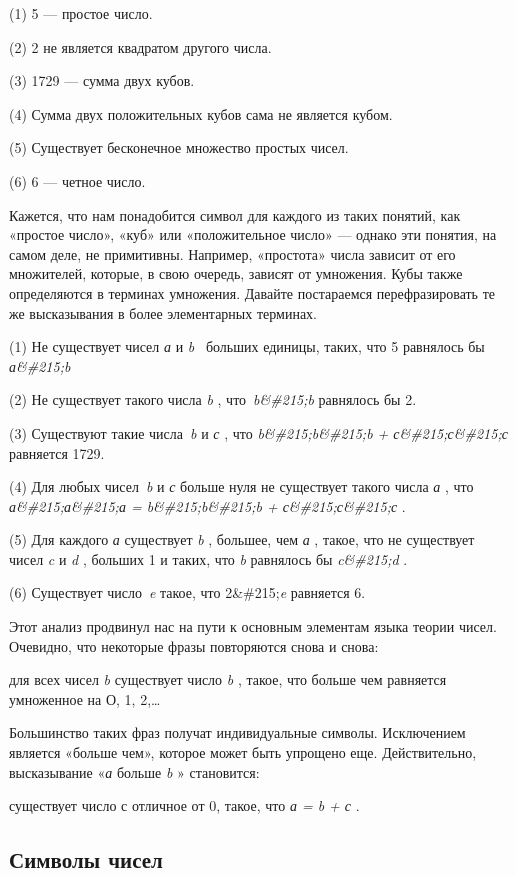 \documentclass[../main.tex]{subfiles}
\begin{document}
(1) 5 --- простое число.

(2) 2 не является квадратом другого числа.

(3) 1729 --- сумма двух кубов.

(4) Сумма двух положительных кубов сама не является кубом.

(5) Существует бесконечное множество простых чисел.

(6) 6 --- четное число.

Кажется, что нам понадобится символ для каждого из таких понятий, как «простое число», «куб» или «положительное число» --- однако эти понятия, на самом деле, не примитивны. Например, «простота» числа зависит от его множителей, которые, в свою очередь, зависят от умножения. Кубы также определяются в терминах умножения. Давайте постараемся перефразировать те же высказывания в более элементарных терминах.

(1) Не существует чисел \emph{а} и \emph{b} ~больших единицы, таких, что 5 равнялось бы \emph{а\&\#215;b}

(2) Не существует такого числа \emph{b} , что~\emph{b\&\#215;b} равнялось бы 2.

(3) Существуют такие числа~\emph{b} и \emph{с} , что \emph{b\&\#215;b\&\#215;b + с\&\#215;с\&\#215;с} равняется 1729.

(4) Для любых чисел~\emph{b} и \emph{с} больше нуля не существует такого числа \emph{а} , что \emph{а\&\#215;а\&\#215;а = b\&\#215;b\&\#215;b + с\&\#215;с\&\#215;с} .

(5) Для каждого \emph{а} существует \emph{b} , большее, чем \emph{а} , такое, что не существует чисел \emph{c} и \emph{d} , больших 1 и таких, что \emph{b} равнялось бы \emph{c\&\#215;d} .

(6) Существует число~\emph{e} такое, что 2\&\#215;\emph{e} равняется 6.

Этот анализ продвинул нас на пути к основным элементам языка теории чисел. Очевидно, что некоторые фразы повторяются снова и снова:

для всех чисел \emph{b} существует число \emph{b} , такое, что больше чем равняется умноженное на О, 1, 2,\ldots{}

Большинство таких фраз получат индивидуальные символы. Исключением является «больше чем», которое может быть упрощено еще. Действительно, высказывание «\emph{а} больше \emph{b} » становится:

существует число с отличное от 0, такое, что \emph{а = b + с} .


\subsection{Символы чисел}
\end{document}
